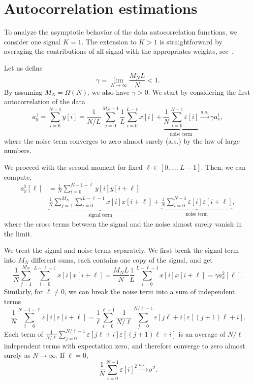 \documentclass[english,11pt]{article}
\numberwithin{equation}{section}
\theoremstyle{plain}
\theoremstyle{definition}
\theoremstyle{remark}
\theoremstyle{plain}
\theoremstyle{remark}
\theoremstyle{plain}
\theoremstyle{plain}
\begin{document}
\section{Autocorrelation estimations} \label{sec:autocorrelation_computation}
 
To analyze the asymptotic behavior of the data autocorrelation functions, we consider one signal $K=1$. The extension to $K>1$ is straightforward by averaging the contributions of all signal with the appropriates weights, see~\cite{boumal2017heterogeneous}. 

Let us define
\begin{equation}
\gamma = \lim_{N\to\infty} \frac{M_NL}{N}<1.
\end{equation}
By assuming $M_N=\Omega(N)$, we also have $\gamma>0$.
We start by considering the first autocorrelation of the data
\begin{equation}
a_y^1 = \sum_{i=0}^{N-1} y[i] = \frac{1}{N/L}\sum_{j=0}^{M_N-1}\frac{1}{L}\sum_{i=0}^{L-1}x[i] + \underbrace{\frac{1}{N}\sum_{i=0}^{N-1}\varepsilon[i]}_{\text{noise term}} \xrightarrow{a.s.}\gamma a_x^1,
\end{equation}
where the noise term converges to zero almost surely (a.s.) by the law of large numbers.

We proceed with the second moment for fixed $\ell\in[0,\ldots,L-1]$. Then, we can compute, 
\begin{equation}
\begin{split}
a_y^2[\ell] & = \frac{1}{N}\sum_{i=0}^{N-1-\ell}y[i]y[i+\ell] \\
& \underbrace{\frac{1}{N}\sum_{j=1}^{M_N}\sum_{i=0}^{L-\ell-1}x[i]x[i+\ell]}_{\text{signal term}} + \underbrace{\frac{1}{N}\sum_{i=0}^{N-1}\varepsilon[i]\varepsilon[i+\ell]}_{\text{noise term}},
\end{split}
\end{equation}
where the cross terms between the signal and the noise almost surely vanish in the limit. 

We treat the signal and noise terms separately. We first break the signal term into $M_N$ different sums, each contains one copy of the signal, and get
\begin{equation} \label{eq:2nd_moment_signal_term}
\frac{1}{N}\sum_{j=1}^{M_N}\sum_{i=0}^{L-\ell-1}x[i]x[i+\ell] = \frac{M_NL}{N}\frac{1}{L}\sum_{i=0}^{L-\ell-1}x[i]x[i+\ell] = \gamma a_x^2[\ell].
\end{equation}
Similarly, for $\ell\neq 0$, we can break the noise term into a sum of independent terms 
\begin{equation}
\frac{1}{N}\sum_{i=0}^{N-1-\ell} \varepsilon[i]\varepsilon[i+\ell] = \frac{1}{\ell}\sum_{i=0}^{\ell-1}\frac{1}{N/\ell}\sum_{j=0}^{N/\ell -1} \varepsilon[j\ell + i] \varepsilon[(j+1)\ell + i].
\end{equation}
Each term of $\frac{1}{N/\ell}\sum_{j=0}^{N/\ell -1} \varepsilon[j\ell + i] \varepsilon[(j+1)\ell + i]$ is an average of $N/\ell$ independent terms with expectation zero, and therefore converge to zero almost surely as $N\to\infty$.
If $\ell=0$, 
\begin{equation}
\frac{1}{N}\sum_{i=0}^{N-1} \varepsilon[i]^2 \xrightarrow{a.s.} \sigma^2.
\end{equation}
\end{document}
